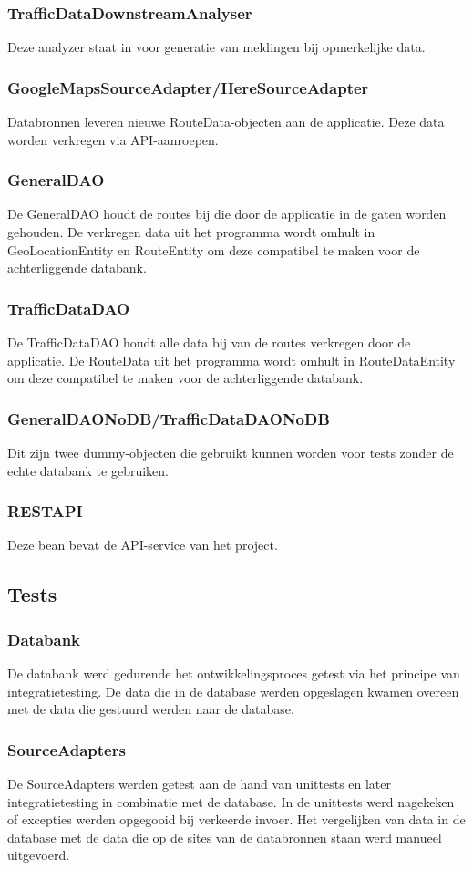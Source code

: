 \documentclass[ps,a4paper,oneside]{report}
\begin{document}
\subsubsection{TrafficDataDownstreamAnalyser}
Deze analyzer staat in voor generatie van meldingen bij opmerkelijke data.
\subsubsection{GoogleMapsSourceAdapter/HereSourceAdapter}
Databronnen leveren nieuwe RouteData-objecten aan de applicatie. Deze data worden verkregen via API-aanroepen.
\subsubsection{GeneralDAO}
De GeneralDAO houdt de routes bij die door de applicatie in de gaten worden gehouden. De verkregen data uit het programma wordt omhult in GeoLocationEntity en RouteEntity om deze compatibel te maken voor de achterliggende databank.
\subsubsection{TrafficDataDAO}
De TrafficDataDAO houdt alle data bij van de routes verkregen door de applicatie. De RouteData uit het programma wordt omhult in RouteDataEntity om deze compatibel te maken voor de achterliggende databank.
\subsubsection{GeneralDAONoDB/TrafficDataDAONoDB}
Dit zijn twee dummy-objecten die gebruikt kunnen worden voor tests zonder de echte databank te gebruiken.
\subsubsection{RESTAPI}
Deze bean bevat de API-service van het project.
\subsection{Tests}
\subsubsection{Databank}
De databank werd gedurende het ontwikkelingsproces getest via het principe van integratietesting. De data die in de database werden opgeslagen kwamen overeen met de data die gestuurd werden naar de database.
\subsubsection{SourceAdapters}
De SourceAdapters werden getest aan de hand van unittests en later integratietesting in combinatie met de database. In de unittests werd nagekeken of excepties werden opgegooid bij verkeerde invoer. Het vergelijken van data in de database met de data die op de sites van de databronnen staan werd manueel uitgevoerd.
\end{document}
